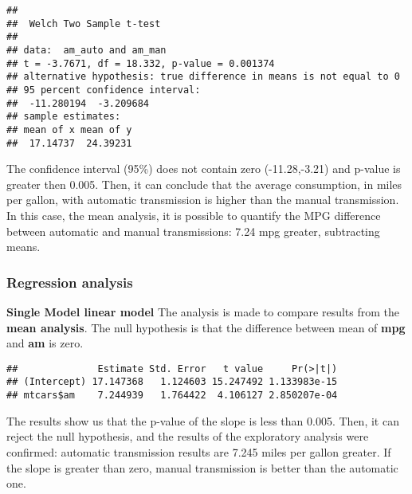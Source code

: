 \documentclass[
]{article}
\newenvironment{Shaded}{\begin{snugshade}}{\end{snugshade}}
\newcommand{\FunctionTok}[1]{\textcolor[rgb]{0.13,0.29,0.53}{\textbf{#1}}}
\newcommand{\NormalTok}[1]{#1}
\newcommand{\OtherTok}[1]{\textcolor[rgb]{0.56,0.35,0.01}{#1}}
\newcommand{\SpecialCharTok}[1]{\textcolor[rgb]{0.81,0.36,0.00}{\textbf{#1}}}
\begin{document}
\begin{verbatim}
## 
##  Welch Two Sample t-test
## 
## data:  am_auto and am_man
## t = -3.7671, df = 18.332, p-value = 0.001374
## alternative hypothesis: true difference in means is not equal to 0
## 95 percent confidence interval:
##  -11.280194  -3.209684
## sample estimates:
## mean of x mean of y 
##  17.14737  24.39231
\end{verbatim}

The confidence interval (95\%) does not contain zero (-11.28,-3.21) and
p-value is greater then 0.005. Then, it can conclude that the average
consumption, in miles per gallon, with automatic transmission is higher
than the manual transmission. In this case, the mean analysis, it is
possible to quantify the MPG difference between automatic and manual
transmissions: 7.24 mpg greater, subtracting means.

\hypertarget{regression-analysis}{%
\subsubsection{Regression analysis}\label{regression-analysis}}

\textbf{Single Model linear model} The analysis is made to compare
results from the \textbf{mean analysis}. The null hypothesis is that the
difference between mean of \textbf{mpg} and \textbf{am} is zero.

\begin{Shaded}
\end{Shaded}

\begin{verbatim}
##              Estimate Std. Error   t value     Pr(>|t|)
## (Intercept) 17.147368   1.124603 15.247492 1.133983e-15
## mtcars$am    7.244939   1.764422  4.106127 2.850207e-04
\end{verbatim}

The results show us that the p-value of the slope is less than 0.005.
Then, it can reject the null hypothesis, and the results of the
exploratory analysis were confirmed: automatic transmission results are
7.245 miles per gallon greater. If the slope is greater than zero,
manual transmission is better than the automatic one.
\end{document}
